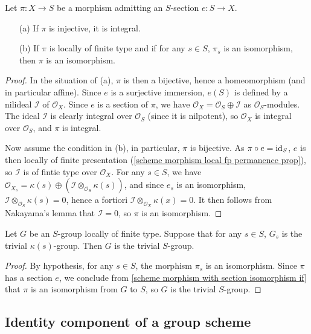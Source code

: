 \begin{lemma}\label{scheme morphism with section isomorphism if}
Let $\pi:X\to S$ be a morphism admitting an $S$-section $e:S\to X$.
\begin{enumerate}
    \item[(a)] If $\pi$ is injective, it is integral.
    \item[(b)] If $\pi$ is locally of finite type and if for any $s\in S$, $\pi_s$ is an isomorphism, then $\pi$ is an isomorphism.
\end{enumerate}
\end{lemma}
\begin{proof}
In the situation of (a), $\pi$ is then a bijective, hence a homeomorphism (and in particular affine). Since $e$ is a surjective immersion, $e(S)$ is defined by a nilideal $\mathscr{I}$ of $\mathscr{O}_X$. Since $e$ is a section of $\pi$, we have $\mathscr{O}_X=\mathscr{O}_S\oplus\mathscr{I}$ as $\mathscr{O}_S$-modules. The ideal $\mathscr{I}$ is clearly integral over $\mathscr{O}_S$ (since it is nilpotent), so $\mathscr{O}_X$ is integral over $\mathscr{O}_S$, and $\pi$ is integral.\par
Now assume the condition in (b), in particular, $\pi$ is bijective. As $\pi\circ e=\operatorname{id}_S$, $e$ is then locally of finite presentation (\cref{scheme morphism local fp permanence prop}), so $\mathscr{I}$ is of fintie type over $\mathscr{O}_X$. For any $s\in S$, we have $\mathscr{O}_{X_s}=\kappa(s)\oplus(\mathscr{I}\otimes_{\mathscr{O}_S}\kappa(s))$, and since $e_s$ is an isomorphism, $\mathscr{I}\otimes_{\mathscr{O}_S}\kappa(s)=0$, hence a fortiori $\mathscr{I}\otimes_{\mathscr{O}_X}\kappa(x)=0$. It then follows from Nakayama's lemma that $\mathscr{I}=0$, so $\pi$ is an isomorphism.
\end{proof}

\begin{proposition}\label{scheme group local ft trivial iff fiber trivial}
Let $G$ be an $S$-group locally of finite type. Suppose that for any $s\in S$, $G_s$ is the trivial $\kappa(s)$-group. Then $G$ is the trivial $S$-group.
\end{proposition}
\begin{proof}
By hypothesis, for any $s\in S$, the morphism $\pi_s$ is an isomorphism. Since $\pi$ has a section $e$, we conclude from \cref{scheme morphism with section isomorphism if} that $\pi$ is an isomorphism from $G$ to $S$, so $G$ is the trivial $S$-group.
\end{proof}

\subsection{Identity component of a group scheme}

